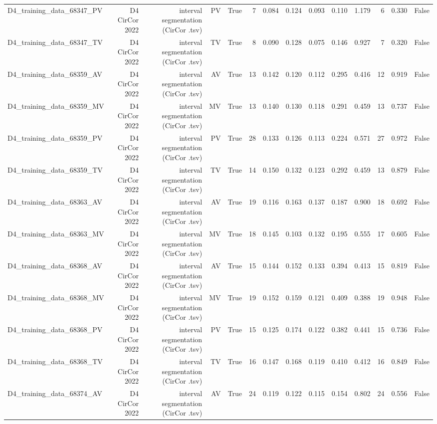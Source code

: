 \begin{table}[htbp]
\begin{tabular}{lrrrrrrrrrrrrr}
    D4\_training\_data\_68347\_PV & D4 CirCor 2022 & interval segmentation (CirCor .tsv) & PV & True & 7 & 0.084 & 0.124 & 0.093 & 0.110 & 1.179 & 6 & 0.330 & False \\
    D4\_training\_data\_68347\_TV & D4 CirCor 2022 & interval segmentation (CirCor .tsv) & TV & True & 8 & 0.090 & 0.128 & 0.075 & 0.146 & 0.927 & 7 & 0.320 & False \\
    D4\_training\_data\_68359\_AV & D4 CirCor 2022 & interval segmentation (CirCor .tsv) & AV & True & 13 & 0.142 & 0.120 & 0.112 & 0.295 & 0.416 & 12 & 0.919 & False \\
    D4\_training\_data\_68359\_MV & D4 CirCor 2022 & interval segmentation (CirCor .tsv) & MV & True & 13 & 0.140 & 0.130 & 0.118 & 0.291 & 0.459 & 13 & 0.737 & False \\
    D4\_training\_data\_68359\_PV & D4 CirCor 2022 & interval segmentation (CirCor .tsv) & PV & True & 28 & 0.133 & 0.126 & 0.113 & 0.224 & 0.571 & 27 & 0.972 & False \\
    D4\_training\_data\_68359\_TV & D4 CirCor 2022 & interval segmentation (CirCor .tsv) & TV & True & 14 & 0.150 & 0.132 & 0.123 & 0.292 & 0.459 & 13 & 0.879 & False \\
    D4\_training\_data\_68363\_AV & D4 CirCor 2022 & interval segmentation (CirCor .tsv) & AV & True & 19 & 0.116 & 0.163 & 0.137 & 0.187 & 0.900 & 18 & 0.692 & False \\
    D4\_training\_data\_68363\_MV & D4 CirCor 2022 & interval segmentation (CirCor .tsv) & MV & True & 18 & 0.145 & 0.103 & 0.132 & 0.195 & 0.555 & 17 & 0.605 & False \\
    D4\_training\_data\_68368\_AV & D4 CirCor 2022 & interval segmentation (CirCor .tsv) & AV & True & 15 & 0.144 & 0.152 & 0.133 & 0.394 & 0.413 & 15 & 0.819 & False \\
    D4\_training\_data\_68368\_MV & D4 CirCor 2022 & interval segmentation (CirCor .tsv) & MV & True & 19 & 0.152 & 0.159 & 0.121 & 0.409 & 0.388 & 19 & 0.948 & False \\
    D4\_training\_data\_68368\_PV & D4 CirCor 2022 & interval segmentation (CirCor .tsv) & PV & True & 15 & 0.125 & 0.174 & 0.122 & 0.382 & 0.441 & 15 & 0.736 & False \\
    D4\_training\_data\_68368\_TV & D4 CirCor 2022 & interval segmentation (CirCor .tsv) & TV & True & 16 & 0.147 & 0.168 & 0.119 & 0.410 & 0.412 & 16 & 0.849 & False \\
    D4\_training\_data\_68374\_AV & D4 CirCor 2022 & interval segmentation (CirCor .tsv) & AV & True & 24 & 0.119 & 0.122 & 0.115 & 0.154 & 0.802 & 24 & 0.556 & False \\

\end{tabular}
\end{table}
